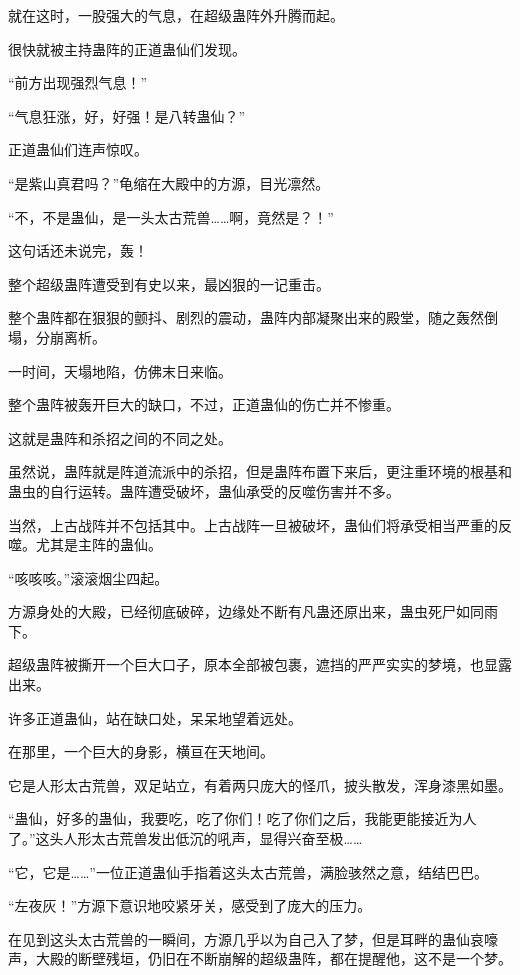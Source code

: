 
\begin{this_body}

就在这时，一股强大的气息，在超级蛊阵外升腾而起。

很快就被主持蛊阵的正道蛊仙们发现。

“前方出现强烈气息！”

“气息狂涨，好，好强！是八转蛊仙？”

正道蛊仙们连声惊叹。

“是紫山真君吗？”龟缩在大殿中的方源，目光凛然。

“不，不是蛊仙，是一头太古荒兽……啊，竟然是？！”

这句话还未说完，轰！

整个超级蛊阵遭受到有史以来，最凶狠的一记重击。

整个蛊阵都在狠狠的颤抖、剧烈的震动，蛊阵内部凝聚出来的殿堂，随之轰然倒塌，分崩离析。

一时间，天塌地陷，仿佛末日来临。

整个蛊阵被轰开巨大的缺口，不过，正道蛊仙的伤亡并不惨重。

这就是蛊阵和杀招之间的不同之处。

虽然说，蛊阵就是阵道流派中的杀招，但是蛊阵布置下来后，更注重环境的根基和蛊虫的自行运转。蛊阵遭受破坏，蛊仙承受的反噬伤害并不多。

当然，上古战阵并不包括其中。上古战阵一旦被破坏，蛊仙们将承受相当严重的反噬。尤其是主阵的蛊仙。

“咳咳咳。”滚滚烟尘四起。

方源身处的大殿，已经彻底破碎，边缘处不断有凡蛊还原出来，蛊虫死尸如同雨下。

超级蛊阵被撕开一个巨大口子，原本全部被包裹，遮挡的严严实实的梦境，也显露出来。

许多正道蛊仙，站在缺口处，呆呆地望着远处。

在那里，一个巨大的身影，横亘在天地间。

它是人形太古荒兽，双足站立，有着两只庞大的怪爪，披头散发，浑身漆黑如墨。

“蛊仙，好多的蛊仙，我要吃，吃了你们！吃了你们之后，我能更能接近为人了。”这头人形太古荒兽发出低沉的吼声，显得兴奋至极……

“它，它是……”一位正道蛊仙手指着这头太古荒兽，满脸骇然之意，结结巴巴。

“左夜灰！”方源下意识地咬紧牙关，感受到了庞大的压力。

在见到这头太古荒兽的一瞬间，方源几乎以为自己入了梦，但是耳畔的蛊仙哀嚎声，大殿的断壁残垣，仍旧在不断崩解的超级蛊阵，都在提醒他，这不是一个梦。


\end{this_body}
